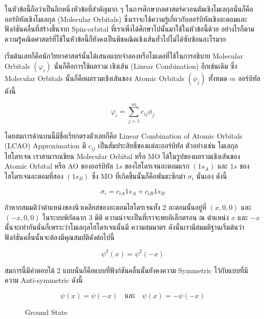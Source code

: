 ในหัวข้อนี้ถือว่าเป็นอีกหนึ่งหัวข้อที่สำคัญมาก ๆ ในการศึกษากลศาสตร์ควอนตัมเชิงโมเลกุลนั่นก็คือออร์บิทัลเชิงโมเลกุล (Molecular Orbitals)
ซึ่งเราจะใช้ความรู้เกี่ยวกับออร์บิทัลเชิงอะตอมและฟังก์ชันคลื่นที่สร้างขึ้นจาก Spin-orbital ที่เราเพิ่งได้ศึกษาไปนั้นมาใช้ในหัวข้อนี้ด้วย
อย่างไรก็ตาม ความรู้คณิตศาสตร์ที่ใช้ในหัวข้อนี้ก็ยังคงเป็นพีชคณิตเชิงเส้นทั่วไปไม่ได้ซับซ้อนอะไรมาก

เริ่มต้นเลยก็คือนักวิทยาศาสตร์นั้นได้เสนอแบบจำลองหรือโมเดลที่ใช้ในการอธิบาย Molecular Orbitals $(\varphi_i)$ นั่นก็คือการใช้ผลรวม%
เชิงเส้น (Linear Combination) อีกเช่นเดิม ซึ่ง Molecular Orbitals นั้นก็คือผลรวมเชิงเส้นของ Atomic Orbitals $(\phi_j)$ ทั้งหมด
$m$ ออร์บิทัล ดังนี้

\begin{equation}
    \label{eq:LCAO}
    \varphi_i = \sum_{j=1}^m c_{i j} \phi_j
\end{equation}

\noindent โดยสมการด้านบนนี้มีชื่อเรียกตรงตัวเลยก็คือ Linear Combination of Atomic Orbitals (LCAO) Approximation
มี $c_{i j}$ เป็นสัมประสิทธิ์ของแต่ละออร์บิทัล ตัวอย่างเช่น โมเลกุลไฮโดรเจน  เราสามารถเขียน Molecular Orbital หรือ MO
ได้ในรูปของผลรวมเชิงเส้นของ Atomic Orbital หรือ AO ของออร์บิทัล $1 s$ ของไฮโดรเจนอะตอมแรก $(1 s_A)$ และ $1 s$
ของไฮโดรเจนอะตอมที่สอง $(1 s_B)$ ซึ่ง MO ที่เกิดขึ้นนั้นก็คือพันธะซิกม่า $\sigma_i$ นั่นเอง ดังนี้

\begin{equation}
    \sigma_i = c_{i A} 1 s_A+c_{i B} 1 s_B
\end{equation}

ถ้าหากสมมติว่าตำแหน่งของนิวเคลียสของอะตอมไฮโดรเจนทั้ง 2 อะตอมนั้นอยู่ที่ $\left(x, 0,0\right)$ และ $\left(-x, 0,0\right)$
ในระบบพิกัดฉาก 3 มิติ ความน่าจะเป็นที่เราจะพบอิเล็กตรอน ณ ตำแหน่ง $x$ และ $-x$ นั้นจะเท่ากันนั่นก็เพราะว่าโมเลกุลไฮโดรเจนนั้นมี%
ความสมมาตร ดังนั้นเรามีสมมติฐานเริ่มต้นว่าฟังก์ชันคลื่นนั้นจะต้องมีคุณสมบัติดังต่อไปนี้

\begin{equation}
    \psi^2(x) = \psi^2(-x)
\end{equation}

\noindent สมการนี้มีคำตอบได้ 2 แบบนั่นก็คือแบบที่ฟังก์ชันคลื่นนั้นยังคงความ Symmetric ไว้กับแบบที่มีความ Anti-symmetric ดังนี้

\begin{equation}
    \psi(x) = \psi(-x)
    \quad \text{และ} \quad
    \psi(x) = -\psi(-x)
\end{equation}

\begin{figure}[htbp]
    \label{fig:MO_H2_ground}
    \centering
    \begin{MOdiagram}[names,style=square]
    \end{MOdiagram}
    \caption{Ground State}
\end{figure}

